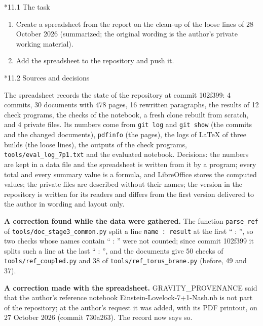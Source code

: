 \documentclass[10pt,a4paper]{article}
\makeatletter
\renewcommand\subsection{\@startsection{subsection}{2}{\z@}{-3.25ex\@plus -1ex \@minus -.2ex}{1.5ex \@plus .2ex}{\normalfont\large\bfseries\raggedright}}
\makeatother
\begin{document}
\subsection*{11.1 The task}
\begin{enumerate}
\item Create a spreadsheet from the report on the clean-up of the loose lines of 28 October 2026 (summarized; the original wording is the author’s private working material).
\item Add the spreadsheet to the repository and push it.
\end{enumerate}
\subsection*{11.2 Sources and decisions}
The spreadsheet records the state of the repository at commit 102f399: 4 commits, 30 documents with 478 pages, 16 rewritten paragraphs, the results of 12 check programs, the checks of the notebook, a fresh clone rebuilt from scratch, and 4 private files. Its numbers come from \texttt{git log} and \texttt{git show} (the commits and the changed documents), \texttt{pdfinfo} (the pages), the logs of LaTeX of three builds (the loose lines), the outputs of the check programs, \texttt{tools/\allowbreak{}eval\_\allowbreak{}log\_\allowbreak{}7p1.txt} and the evaluated notebook. Decisions: the numbers are kept in a data file and the spreadsheet is written from it by a program; every total and every summary value is a formula, and LibreOffice stores the computed values; the private files are described without their names; the version in the repository is written for its readers and differs from the first version delivered to the author in wording and layout only.

\textbf{A correction found while the data were gathered.} The function \texttt{parse\_\allowbreak{}ref} of \texttt{tools/\allowbreak{}doc\_\allowbreak{}stage3\_\allowbreak{}common.py} split a line \texttt{name : result} at the first “ : ”, so two checks whose names contain “ : ” were not counted; since commit 102f399 it splits such a line at the last “ : ”, and the documents give 50 checks of \texttt{tools/\allowbreak{}ref\_\allowbreak{}coupled.py} and 38 of \texttt{tools/\allowbreak{}ref\_\allowbreak{}torus\_\allowbreak{}brane.py} (before, 49 and 37).

\textbf{A correction made with the spreadsheet.} GRAVITY\_PROVENANCE said that the author’s reference notebook Einstein-Lovelock-7+1-Nash.nb is not part of the repository; at the author’s request it was added, with its PDF printout, on 27 October 2026 (commit 730a263). The record now says so.
\end{document}
